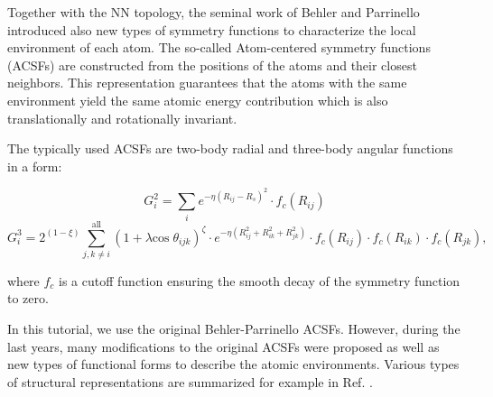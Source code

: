 \documentclass[12pt]{article}
\begin{document}
Together with the NN topology, the seminal work of Behler and Parrinello introduced also new types of symmetry functions to characterize the local environment of each atom. The so-called Atom-centered symmetry functions (ACSFs)\cite{behl11jcp} are constructed from the positions of the atoms and their closest neighbors. This representation guarantees that the atoms with the same environment yield the same atomic energy contribution which is also translationally and rotationally invariant. 

The typically used ACSFs are two-body radial and three-body angular functions in a form:

\begin{equation}
    G_i^2  = \sum_i e^{-\eta (R_{ij}-R_s)^2} \cdot f_c(R_{ij}) \label{eq:radial}
\end{equation}
\begin{equation}
    G_i^3  = 2^{(1-\xi)} \sum_{j,k \neq i}^{\mathrm{all}}(1 + \lambda \mathrm{cos}\;\theta_{ijk})^{\zeta} \cdot e^{-\eta (R_{ij}^2 + R_{ik}^2 + R_{jk}^2)} \cdot f_c(R_{ij}) \cdot f_c(R_{ik}) \cdot f_c(R_{jk}),
    \label{eq:angular}
\end{equation}

where $f_c$ is a cutoff function ensuring the smooth decay of the symmetry function to zero.   

In this tutorial, we use the original Behler-Parrinello ACSFs. However, during the last years, many modifications to the original ACSFs were proposed as well as new types of functional forms to describe the atomic environments. Various types of structural representations are summarized for example in Ref. .
\end{document}
